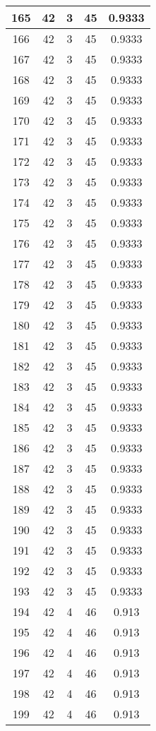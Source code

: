 \documentclass[letterpaper, 12pt]{article}
\begin{document}
\begin{longtable}{|c|c|c|c|c|}
\hline
165 & 42 & 3 & 45 & 0.9333 \\
\hline
166 & 42 & 3 & 45 & 0.9333 \\
\hline
167 & 42 & 3 & 45 & 0.9333 \\
\hline
168 & 42 & 3 & 45 & 0.9333 \\
\hline
169 & 42 & 3 & 45 & 0.9333 \\
\hline
170 & 42 & 3 & 45 & 0.9333 \\
\hline
171 & 42 & 3 & 45 & 0.9333 \\
\hline
172 & 42 & 3 & 45 & 0.9333 \\
\hline
173 & 42 & 3 & 45 & 0.9333 \\
\hline
174 & 42 & 3 & 45 & 0.9333 \\
\hline
175 & 42 & 3 & 45 & 0.9333 \\
\hline
176 & 42 & 3 & 45 & 0.9333 \\
\hline
177 & 42 & 3 & 45 & 0.9333 \\
\hline
178 & 42 & 3 & 45 & 0.9333 \\
\hline
179 & 42 & 3 & 45 & 0.9333 \\
\hline
180 & 42 & 3 & 45 & 0.9333 \\
\hline
181 & 42 & 3 & 45 & 0.9333 \\
\hline
182 & 42 & 3 & 45 & 0.9333 \\
\hline
183 & 42 & 3 & 45 & 0.9333 \\
\hline
184 & 42 & 3 & 45 & 0.9333 \\
\hline
185 & 42 & 3 & 45 & 0.9333 \\
\hline
186 & 42 & 3 & 45 & 0.9333 \\
\hline
187 & 42 & 3 & 45 & 0.9333 \\
\hline
188 & 42 & 3 & 45 & 0.9333 \\
\hline
189 & 42 & 3 & 45 & 0.9333 \\
\hline
190 & 42 & 3 & 45 & 0.9333 \\
\hline
191 & 42 & 3 & 45 & 0.9333 \\
\hline
192 & 42 & 3 & 45 & 0.9333 \\
\hline
193 & 42 & 3 & 45 & 0.9333 \\
\hline
194 & 42 & 4 & 46 & 0.913 \\
\hline
195 & 42 & 4 & 46 & 0.913 \\
\hline
196 & 42 & 4 & 46 & 0.913 \\
\hline
197 & 42 & 4 & 46 & 0.913 \\
\hline
198 & 42 & 4 & 46 & 0.913 \\
\hline
199 & 42 & 4 & 46 & 0.913 \\
\hline
\end{longtable}
\end{document}
